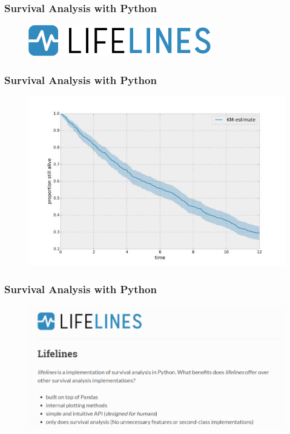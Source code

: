 \documentclass[MasterNotes.tex]{subfiles}
\begin{document}
\begin{frame}
	\frametitle{Survival Analysis with Python}
	\large
\begin{figure}
\centering
\includegraphics[width=0.99\linewidth]{images/lifelines-logo}
\caption{}
\label{fig:lifelines-logo}
\end{figure}
\end{frame}
\begin{frame}
\frametitle{Survival Analysis with Python}
\large	

\begin{figure}
\centering
\includegraphics[width=0.97\linewidth]{images/lifelines-kmplot}
\caption{}
\label{fig:lifelines-kmplot}
\end{figure}
\end{frame}
\begin{frame}[fragile]
\frametitle{Survival Analysis with Python}
\large	
\begin{figure}
\centering
\includegraphics[width=0.7\linewidth]{images/LifeLines-Screenshot}
\caption{}
\label{fig:LifeLines-Screenshot}
\end{figure}





\end{frame}
\end{document}
